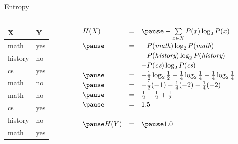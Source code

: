 \documentclass[12pt]{beamer}
\newcommand{\EM}[1]{\mbox{\em#1}}
\begin{document}
\begin{frame}{Entropy}
	\begin{columns}
		\begin{column}{1.1in}
			\begin{tabular}{ll}
				X       & Y   \\
				\hline
				math    & yes \\
				history & no  \\
				cs      & yes \\
				math    & no  \\
				math    & no  \\
				cs      & yes \\
				history & no  \\
				math    & yes \\
			\end{tabular}
		\end{column}
		\begin{column}{3.1in}
			\pause
			$
			\extrarowheight=2pt
			\begin{array}{lll}
				H(X)        & = & \pause -\sum\limits_{x \in X}P(x)\log_2 P(x) \\
				     \pause & = & -P(\EM{math})\log_2 P(\EM{math}) \\
				            &   & -P(\EM{history})\log_2 P(\EM{history}) \\
				            &   & -P(\EM{cs})\log_2 P(\EM{cs}) \\
				     \pause & = & -\frac{1}{2}\log_2\frac{1}{2} 
				                  -\frac{1}{4}\log_2\frac{1}{4}
				                  -\frac{1}{4}\log_2\frac{1}{4} \\
				     \pause & = & -\frac{1}{2}(-1) - \frac{1}{4}(-2) - \frac{1}{4}(-2) \\
				     \pause & = & \frac{1}{2} + \frac{1}{2} + \frac{1}{2} \\
				     \pause & = & 1.5 \\
				\\
				\pause
				H(Y)        & = & \pause 1.0 \\
			\end{array}
			$
		\end{column}
	\end{columns}
\end{frame}
\end{document}
